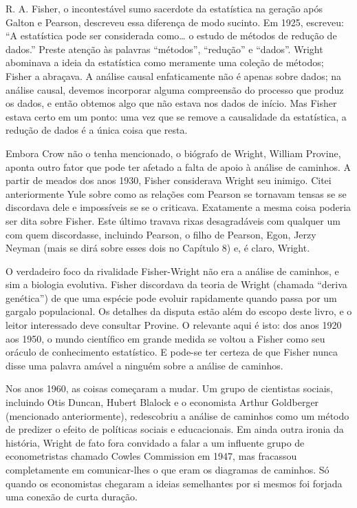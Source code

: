 \documentclass[11pt,a5paper,twoside]{book}
\begin{document}
R. A. Fisher, o incontestável sumo sacerdote da estatística na geração após Galton e Pearson, descreveu essa diferença de modo sucinto. Em 1925, escreveu: “A estatística pode ser considerada como… o estudo de métodos de redução de dados.” Preste atenção às palavras “métodos”, “redução” e “dados”. Wright abominava a ideia da estatística como meramente uma coleção de métodos; Fisher a abraçava. A análise causal enfaticamente não é apenas sobre dados; na análise causal, devemos incorporar alguma compreensão do processo que produz os dados, e então obtemos algo que não estava nos dados de início. Mas Fisher estava certo em um ponto: uma vez que se remove a causalidade da estatística, a redução de dados é a única coisa que resta.

Embora Crow não o tenha mencionado, o biógrafo de Wright, William Provine, aponta outro fator que pode ter afetado a falta de apoio à análise de caminhos. A partir de meados dos anos 1930, Fisher considerava Wright seu inimigo. Citei anteriormente Yule sobre como as relações com Pearson se tornavam tensas se se discordava dele e impossíveis se se o criticava. Exatamente a mesma coisa poderia ser dita sobre Fisher. Este último travava rixas desagradáveis com qualquer um com quem discordasse, incluindo Pearson, o filho de Pearson, Egon, Jerzy Neyman (mais se dirá sobre esses dois no Capítulo 8) e, é claro, Wright.

O verdadeiro foco da rivalidade Fisher-Wright não era a análise de caminhos, e sim a biologia evolutiva. Fisher discordava da teoria de Wright (chamada “deriva genética”) de que uma espécie pode evoluir rapidamente quando passa por um gargalo populacional. Os detalhes da disputa estão além do escopo deste livro, e o leitor interessado deve consultar Provine. O relevante aqui é isto: dos anos 1920 aos 1950, o mundo científico em grande medida se voltou a Fisher como seu oráculo de conhecimento estatístico. E pode-se ter certeza de que Fisher nunca disse uma palavra amável a ninguém sobre a análise de caminhos.

Nos anos 1960, as coisas começaram a mudar. Um grupo de cientistas sociais, incluindo Otis Duncan, Hubert Blalock e o economista Arthur Goldberger (mencionado anteriormente), redescobriu a análise de caminhos como um método de predizer o efeito de políticas sociais e educacionais. Em ainda outra ironia da história, Wright de fato fora convidado a falar a um influente grupo de econometristas chamado Cowles Commission em 1947, mas fracassou completamente em comunicar-lhes o que eram os diagramas de caminhos. Só quando os economistas chegaram a ideias semelhantes por si mesmos foi forjada uma conexão de curta duração.
\end{document}
